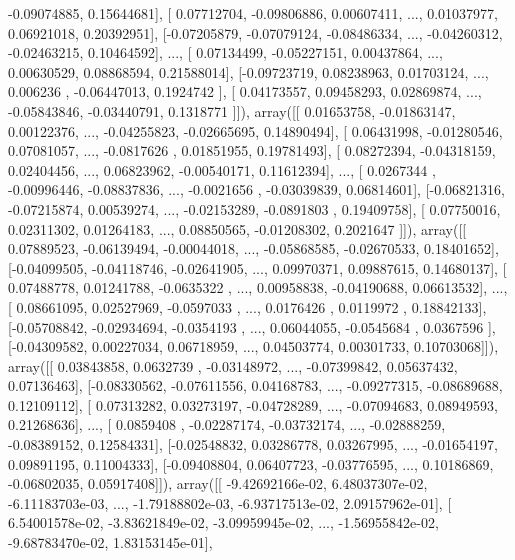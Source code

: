 \documentclass{article}
\begin{document}
        -0.09074885,  0.15644681],
       [ 0.07712704, -0.09806886,  0.00607411, ...,  0.01037977,
         0.06921018,  0.20392951],
       [-0.07205879, -0.07079124, -0.08486334, ..., -0.04260312,
        -0.02463215,  0.10464592],
       ..., 
       [ 0.07134499, -0.05227151,  0.00437864, ...,  0.00630529,
         0.08868594,  0.21588014],
       [-0.09723719,  0.08238963,  0.01703124, ...,  0.006236  ,
        -0.06447013,  0.1924742 ],
       [ 0.04173557,  0.09458293,  0.02869874, ..., -0.05843846,
        -0.03440791,  0.1318771 ]]), array([[ 0.01653758, -0.01863147,  0.00122376, ..., -0.04255823,
        -0.02665695,  0.14890494],
       [ 0.06431998, -0.01280546,  0.07081057, ..., -0.0817626 ,
         0.01851955,  0.19781493],
       [ 0.08272394, -0.04318159,  0.02404456, ...,  0.06823962,
        -0.00540171,  0.11612394],
       ..., 
       [ 0.0267344 , -0.00996446, -0.08837836, ..., -0.0021656 ,
        -0.03039839,  0.06814601],
       [-0.06821316, -0.07215874,  0.00539274, ..., -0.02153289,
        -0.0891803 ,  0.19409758],
       [ 0.07750016,  0.02311302,  0.01264183, ...,  0.08850565,
        -0.01208302,  0.2021647 ]]), array([[ 0.07889523, -0.06139494, -0.00044018, ..., -0.05868585,
        -0.02670533,  0.18401652],
       [-0.04099505, -0.04118746, -0.02641905, ...,  0.09970371,
         0.09887615,  0.14680137],
       [ 0.07488778,  0.01241788, -0.0635322 , ...,  0.00958838,
        -0.04190688,  0.06613532],
       ..., 
       [ 0.08661095,  0.02527969, -0.0597033 , ...,  0.0176426 ,
         0.0119972 ,  0.18842133],
       [-0.05708842, -0.02934694, -0.0354193 , ...,  0.06044055,
        -0.0545684 ,  0.0367596 ],
       [-0.04309582,  0.00227034,  0.06718959, ...,  0.04503774,
         0.00301733,  0.10703068]]), array([[ 0.03843858,  0.0632739 , -0.03148972, ..., -0.07399842,
         0.05637432,  0.07136463],
       [-0.08330562, -0.07611556,  0.04168783, ..., -0.09277315,
        -0.08689688,  0.12109112],
       [ 0.07313282,  0.03273197, -0.04728289, ..., -0.07094683,
         0.08949593,  0.21268636],
       ..., 
       [ 0.0859408 , -0.02287174, -0.03732174, ..., -0.02888259,
        -0.08389152,  0.12584331],
       [-0.02548832,  0.03286778,  0.03267995, ..., -0.01654197,
         0.09891195,  0.11004333],
       [-0.09408804,  0.06407723, -0.03776595, ...,  0.10186869,
        -0.06802035,  0.05917408]]), array([[ -9.42692166e-02,   6.48037307e-02,  -6.11183703e-03, ...,
         -1.79188802e-03,  -6.93717513e-02,   2.09157962e-01],
       [  6.54001578e-02,  -3.83621849e-02,  -3.09959945e-02, ...,
         -1.56955842e-02,  -9.68783470e-02,   1.83153145e-01],
\end{document}
